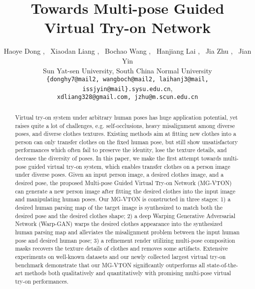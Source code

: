 \documentclass[10pt,twocolumn,letterpaper]{article}
\begin{document}
\title{Towards Multi-pose Guided Virtual Try-on Network}



\author{
Haoye Dong ,~ Xiaodan Liang ,~ Bochao Wang ,~ Hanjiang Lai ,~ Jia Zhu ,~ Jian Yin\\
Sun Yat-sen University,  South China Normal University\\
{\tt\small \{donghy7@mail2, wangboch@mail2, laihanj3@mail, issjyin@mail\}.sysu.edu.cn}, \\
{\tt\small xdliang328@gmail.com, jzhu@m.scun.edu.cn}
}

\maketitle


\begin{abstract}
   Virtual try-on system under arbitrary human poses has huge application potential, yet raises quite a lot of challenges, e.g. self-occlusions, heavy misalignment among diverse poses, and diverse clothes textures. Existing methods aim at fitting new clothes into a person can only transfer clothes on the fixed human pose, but still show unsatisfactory performances which often fail to preserve the identity, lose the texture details, and decrease the diversity of poses. In this paper, we make the first attempt towards multi-pose guided virtual try-on system, which enables transfer clothes on a person image under diverse poses. Given an input person image, a desired clothes image, and a desired pose, the proposed Multi-pose Guided Virtual Try-on Network (MG-VTON) can generate a new person image after fitting the desired clothes into the input image and manipulating human poses. Our MG-VTON is constructed in three stages: 1) a desired human parsing map of the target image is synthesized to match both the desired pose and the desired clothes shape; 2) a deep Warping Generative Adversarial Network (Warp-GAN) warps the desired clothes appearance into the synthesized human parsing map and alleviates the misalignment problem between the input human pose and desired human pose; 3) a refinement render utilizing multi-pose composition masks recovers the texture details of clothes and removes some artifacts. Extensive experiments on well-known datasets and our newly collected largest virtual try-on benchmark demonstrate that our MG-VTON significantly outperforms all state-of-the-art methods both qualitatively and quantitatively with promising multi-pose virtual try-on performances.
\end{abstract}
\end{document}
